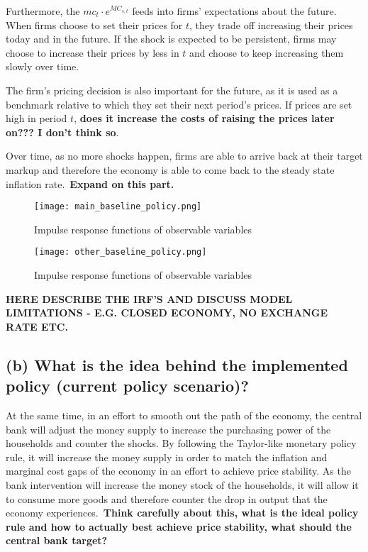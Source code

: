 \documentclass[12pt]{article}
\begin{document}
Furthermore, the $mc_t \cdot e^{MC_{s, t}}$ feeds into firms' expectations about the future. When firms choose to set their prices for $t$, they trade off increasing their prices today and in the future. If the shock is expected to be persistent, firms may choose to increase their prices by less in $t$ and choose to keep increasing them slowly over time. 

The firm's pricing decision is also important for the future, as it is used as a benchmark relative to which they set their next period's prices. If prices are set high in period $t$, \textbf{does it increase the costs of raising the prices later on??? I don't think so}.

Over time, as no more shocks happen, firms are able to arrive back at their target markup and therefore the economy is able to come back to the steady state inflation rate.\ \textbf{Expand on this part.}

\begin{figure}[!h]
    \caption{Impulse response functions of observable variables}\label{fig:main_baseline}
    \centering
    \texttt{[image: main\_baseline\_policy.png]}
\end{figure}

\begin{figure}[!h]
    \caption{Impulse response functions of observable variables}\label{fig:other_baseline}
    \centering
    \texttt{[image: other\_baseline\_policy.png]}
\end{figure}


\textbf{HERE DESCRIBE THE IRF'S AND DISCUSS MODEL LIMITATIONS - E.G. CLOSED ECONOMY, NO EXCHANGE RATE ETC.}

\subsection*{(b) What is the idea behind the implemented policy (current policy scenario)?}

At the same time, in an effort to smooth out the path of the economy, the central bank will adjust the money supply to increase the purchasing power of the households and counter the shocks. By following the Taylor-like monetary policy rule, it will increase the money supply in order to match the inflation and marginal cost gaps of the economy in an effort to achieve price stability. As the bank intervention will increase the money stock of the households, it will allow it to consume more goods and therefore counter the drop in output that the economy experiences.\ \textbf{Think carefully about this, what is the ideal policy rule and how to actually best achieve price stability, what should the central bank target?}
\end{document}
